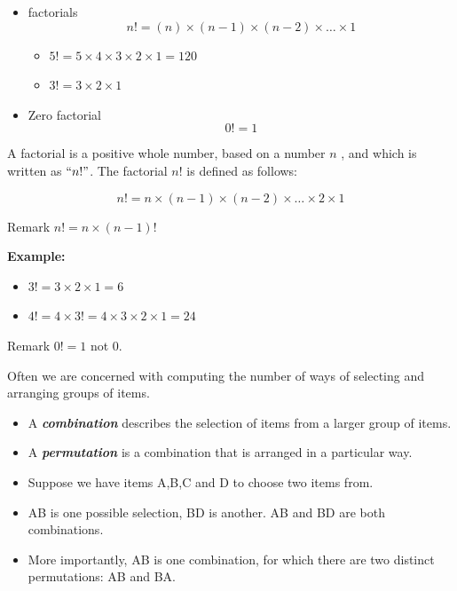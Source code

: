 \documentclass[12pt]{report}
\begin{document}
\begin{itemize}
	\item factorials 
	\[ n! = (n)\times (n-1)\times(n-2) \times \ldots \times 1 \]
	\begin{itemize}
		\item $5! = 5 \times 4 \times 3 \times 2 \times 1 = 120 $
		\item $3! = 3 \times 2 \times 1$
	\end{itemize}
	\item Zero factorial
	\[ 0! =  1 \]
\end{itemize}	
	{\Large
		
		A factorial is a positive whole number, based on a number $n$ , and which is written as $``n!"$. The factorial $n!$ is defined as follows:
		
		\[n!  =n \times (n-1) \times (n-2) \times \ldots \times 2 \times 1 \]
		
		Remark $n!  =n \times (n-1)!$\\ \bigskip
		
		\textbf{ Example: }
		
		\begin{itemize}
			\item $3!  = 3 \times 2  \times 1 = 6 $
			
			\item $4!  = 4 \times 3! = 4 \times 3 \times 2 \times 1 = 24$
		\end{itemize}
		Remark $0! = 1$ not $0$.
		
		
	}
	
	{\Large
		
		
		Often we are concerned with computing the number of ways of selecting and arranging groups of items. \begin{itemize} \item  A \textbf{\emph{combination}} describes the selection of items from a larger group of items.  \item A \textbf{\emph{permutation}} is a combination that is arranged in a particular way.
		\end{itemize}
		
		\bigskip
		\begin{itemize}
			\item Suppose we have items A,B,C and D to choose two items from.
			\item AB is one possible selection, BD is another. AB and BD are both combinations.
			\item More importantly, AB is one combination, for which there are two distinct permutations: AB and BA.
		\end{itemize}
	}
	
\end{document}
